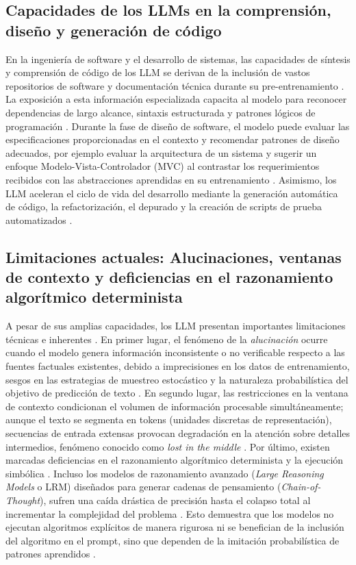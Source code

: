 \documentclass[12pt, letterpaper, oneside]{book}
\begin{document}
\subsection{Capacidades de los LLMs en la comprensión, diseño y generación de código} En la ingeniería de software y el desarrollo de sistemas, las capacidades de síntesis y comprensión de código de los LLM se derivan de la inclusión de vastos repositorios de software y documentación técnica durante su pre-entrenamiento \cite{SurveyforLLM}. La exposición a esta información especializada capacita al modelo para reconocer dependencias de largo alcance, sintaxis estructurada y patrones lógicos de programación \cite{xiao2026foundationslargelanguagemodels}. Durante la fase de diseño de software, el modelo puede evaluar las especificaciones proporcionadas en el contexto y recomendar patrones de diseño adecuados, por ejemplo evaluar la arquitectura de un sistema y sugerir un enfoque Modelo-Vista-Controlador (MVC) al contrastar los requerimientos recibidos con las abstracciones aprendidas en su entrenamiento \cite{SurveyforLLM, TrendonAI2026}. Asimismo, los LLM aceleran el ciclo de vida del desarrollo mediante la generación automática de código, la refactorización, el depurado y la creación de scripts de prueba automatizados \cite{SurveyforLLM, TrendonAI2026}. 
\subsection{Limitaciones actuales: Alucinaciones, ventanas de contexto y deficiencias en el razonamiento algorítmico determinista} A pesar de sus amplias capacidades, los LLM presentan importantes limitaciones técnicas e inherentes \cite{SurveyforLLM, shojaee2025illusion}. En primer lugar, el fenómeno de la \textit{alucinación} ocurre cuando el modelo genera información inconsistente o no verificable respecto a las fuentes factuales existentes, debido a imprecisiones en los datos de entrenamiento, sesgos en las estrategias de muestreo estocástico y la naturaleza probabilística del objetivo de predicción de texto \cite{SurveyforLLM, TrendonAI2026}. En segundo lugar, las restricciones en la ventana de contexto condicionan el volumen de información procesable simultáneamente; aunque el texto se segmenta en tokens (unidades discretas de representación), secuencias de entrada extensas provocan degradación en la atención sobre detalles intermedios, fenómeno conocido como \textit{lost in the middle} \cite{xiao2026foundationslargelanguagemodels}. Por último, existen marcadas deficiencias en el razonamiento algorítmico determinista y la ejecución simbólica \cite{shojaee2025illusion}. Incluso los modelos de razonamiento avanzado (\textit{Large Reasoning Models} o LRM) diseñados para generar cadenas de pensamiento (\textit{Chain-of-Thought}), sufren una caída drástica de precisión hasta el colapso total al incrementar la complejidad del problema \cite{shojaee2025illusion}. Esto demuestra que los modelos no ejecutan algoritmos explícitos de manera rigurosa ni se benefician de la inclusión del algoritmo en el prompt, sino que dependen de la imitación probabilística de patrones aprendidos \cite{shojaee2025illusion}. 
\end{document}
